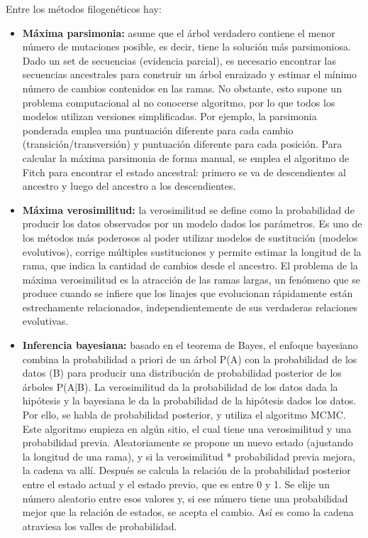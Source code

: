 Entre los métodos filogenéticos hay:
\begin{itemize}
\item \textbf{Máxima parsimonia:} asume que el árbol verdadero contiene el menor número de mutaciones posible, es decir, tiene la solución más parsimoniosa. Dado un set de secuencias (evidencia parcial), es necesario encontrar las secuencias ancestrales para construir un árbol enraizado y estimar el mínimo número de cambios contenidos en las ramas. No obstante, esto supone un problema computacional al no conocerse algoritmo, por lo que todos los modelos utilizan versiones simplificadas. Por ejemplo, la parsimonia ponderada emplea una puntuación diferente para cada cambio (transición/transversión) y puntuación diferente para cada posición. Para calcular la máxima parsimonia de forma manual, se emplea el algoritmo de Fitch para encontrar el estado ancestral: primero se va de descendientes al ancestro y luego del ancestro a los descendientes.
\item \textbf{Máxima verosimilitud:} la verosimilitud se define como la probabilidad de producir los datos observados por un modelo dados los parámetros. Es uno de los métodos más poderosos al poder utilizar modelos de sustitución (modelos evolutivos), corrige múltiples sustituciones y permite estimar la longitud de la rama, que indica la cantidad de cambios desde el ancestro. El problema de la máxima verosimilitud es la atracción de las ramas largas, un fenómeno que se produce cuando se infiere que los linajes que evolucionan rápidamente están estrechamente relacionados, independientemente de sus verdaderas relaciones evolutivas.
\item \textbf{Inferencia bayesiana:} basado en el teorema de Bayes, el enfoque bayesiano combina la probabilidad a priori de un árbol P(A) con la probabilidad de los datos (B) para producir una distribución de probabilidad posterior de los árboles P(A|B). La verosimilitud da la probabilidad de los datos dada la hipótesis y la bayesiana le da la probabilidad de la hipótesis dados los datos. Por ello, se habla de probabilidad posterior, y utiliza el algoritmo MCMC. Este algoritmo empieza en algún sitio, el cual tiene una verosimilitud y una probabilidad previa. Aleatoriamente se propone un nuevo estado (ajustando la longitud de una rama), y si la verosimilitud * probabilidad previa mejora, la cadena va allí. Después se calcula la relación de la probabilidad posterior entre el estado actual y el estado previo, que es entre 0 y 1. Se elije un número aleatorio entre esos valores y, si ese número tiene una probabilidad mejor que la relación de estados, se acepta el cambio. Así es como la cadena atraviesa los valles de probabilidad.
\end{itemize}

